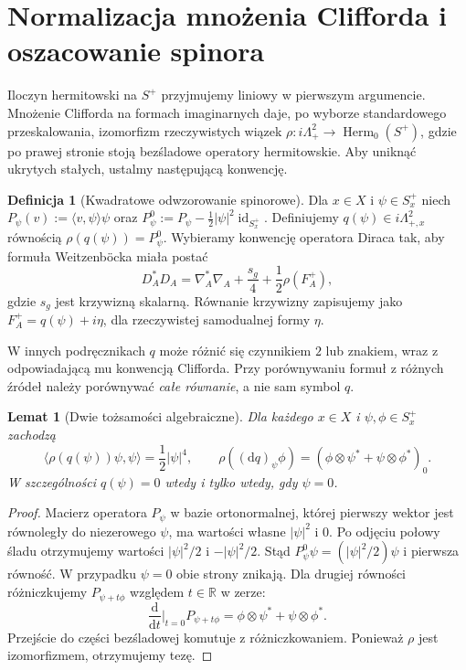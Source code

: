 \documentclass[11pt,a4paper]{report}
\numberwithin{equation}{section}
\theoremstyle{plain}
\newtheorem{lemat}[twierdzenie]{Lemat}
\theoremstyle{definition}
\newtheorem{definicja}[twierdzenie]{Definicja}
\theoremstyle{remark}
\begin{document}
\section{Normalizacja mnożenia Clifforda i oszacowanie spinora}
\label{sec:tg-sw12-clifford}

Iloczyn hermitowski na $S^+$ przyjmujemy liniowy w pierwszym
argumencie. Mnożenie Clifforda na formach imaginarnych daje, po
wyborze standardowego przeskalowania, izomorfizm rzeczywistych
wiązek $\rho\colon i\Lambda^2_+\longrightarrow
\operatorname{Herm}_0(S^+)$, gdzie po prawej stronie stoją
bezśladowe operatory hermitowskie. Aby uniknąć ukrytych stałych,
ustalmy następującą konwencję.

\begin{definicja}[Kwadratowe odwzorowanie spinorowe]
\label{def:tg-sw12-q}
Dla $x\in X$ i $\psi\in S_x^+$ niech
$P_\psi(v):=\langle v,\psi\rangle\psi$ oraz
$P_\psi^0:=P_\psi-\tfrac12|\psi|^2\operatorname{id}_{S_x^+}$.
Definiujemy $q(\psi)\in i\Lambda^2_{+,x}$ równością
$\rho(q(\psi))=P_\psi^0$.
Wybieramy konwencję operatora Diraca tak, aby formuła
Weitzenböcka miała postać
\[
D_A^*D_A=\nabla_A^*\nabla_A+\frac{s_g}{4}
 +\frac12\rho(F_A^+),
\]
gdzie $s_g$ jest krzywizną skalarną. Równanie krzywizny
zapisujemy jako $F_A^+=q(\psi)+i\eta$, dla rzeczywistej
samodualnej formy $\eta$.
\end{definicja}

W innych podręcznikach $q$ może różnić się czynnikiem $2$
lub znakiem, wraz z odpowiadającą mu konwencją Clifforda.
Przy porównywaniu formuł z różnych źródeł należy porównywać
\emph{całe równanie}, a nie sam symbol $q$.

\begin{lemat}[Dwie tożsamości algebraiczne]
\label{lem:tg-sw12-q}
Dla każdego $x\in X$ i $\psi,\phi\in S_x^+$ zachodzą
\[
\langle\rho(q(\psi))\psi,\psi\rangle=\frac12|\psi|^4,
\qquad
\rho((\mathrm dq)_\psi\phi)
=(\phi\otimes\psi^*+\psi\otimes\phi^*)_0.
\]
W szczególności $q(\psi)=0$ wtedy i tylko wtedy, gdy $\psi=0$.
\end{lemat}

\begin{proof}
Macierz operatora $P_\psi$ w bazie ortonormalnej, której
pierwszy wektor jest równoległy do niezerowego $\psi$,
ma wartości własne $|\psi|^2$ i $0$. Po odjęciu połowy
śladu otrzymujemy wartości $|\psi|^2/2$ i $-|\psi|^2/2$.
Stąd $P_\psi^0\psi=(|\psi|^2/2)\psi$ i pierwsza
równość. W przypadku $\psi=0$ obie strony znikają.
Dla drugiej równości różniczkujemy
$P_{\psi+t\phi}$ względem $t\in\mathbb R$ w zerze:
\[
\frac{\mathrm d}{\mathrm dt}\bigg|_{t=0}P_{\psi+t\phi}
=\phi\otimes\psi^*+\psi\otimes\phi^*.
\]
Przejście do części bezśladowej komutuje z różniczkowaniem.
Ponieważ $\rho$ jest izomorfizmem, otrzymujemy tezę.
\end{proof}
\end{document}
